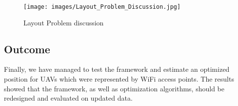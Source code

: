 \begin{figure}[H]
	\centering
	\texttt{[image: images/Layout\_Problem\_Discussion.jpg]}
\caption{Layout Problem discussion}
\end{figure}

\subsection{Outcome}\label{outcome}

Finally, we have managed to test the framework and estimate an optimized
position for UAVs which were represented by WiFi access points. The
results showed that the framework, as well as optimization algorithms,
should be redesigned and evaluated on updated data.
